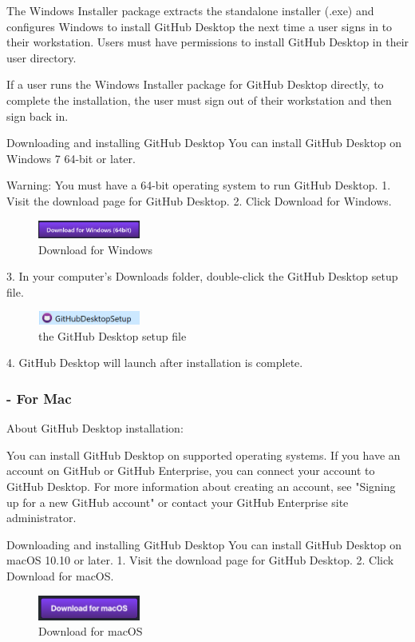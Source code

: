 The Windows Installer package extracts the standalone installer (.exe) and configures Windows to install GitHub Desktop the next time a user signs in to their workstation. Users must have permissions to install GitHub Desktop in their user directory.

If a user runs the Windows Installer package for GitHub Desktop directly, to complete the installation, the user must sign out of their workstation and then sign back in.

Downloading and installing GitHub Desktop
You can install GitHub Desktop on Windows 7 64-bit or later.

Warning: You must have a 64-bit operating system to run GitHub Desktop.
1.	Visit the download page for GitHub Desktop.
2.	Click Download for Windows.
\begin{figure}[ht]
    \centering
    \includegraphics[width=0.3\textwidth]{figures/Download for Windows.png}
    \caption{Download for Windows}
\end{figure}

3. In your computer's Downloads folder, double-click the GitHub Desktop setup file.
\begin{figure}[ht]
    \centering
    \includegraphics[width=0.3\textwidth]{figures/the GitHub Desktop setup file.png}
    \caption{the GitHub Desktop setup file}
\end{figure}

4. GitHub Desktop will launch after installation is complete.



\subsubsection{- For Mac}

About GitHub Desktop installation:

You can install GitHub Desktop on supported operating systems. If you have an account on GitHub or GitHub Enterprise, you can connect your account to GitHub Desktop. For more information about creating an account, see "Signing up for a new GitHub account" or contact your GitHub Enterprise site administrator.

Downloading and installing GitHub Desktop
You can install GitHub Desktop on macOS 10.10 or later.
1.	Visit the download page for GitHub Desktop.
2.	Click Download for macOS.
\begin{figure}[ht]
    \centering
    \includegraphics[width=0.3\textwidth]{figures/Download for macOS.png}
    \caption{Download for macOS}
\end{figure}

